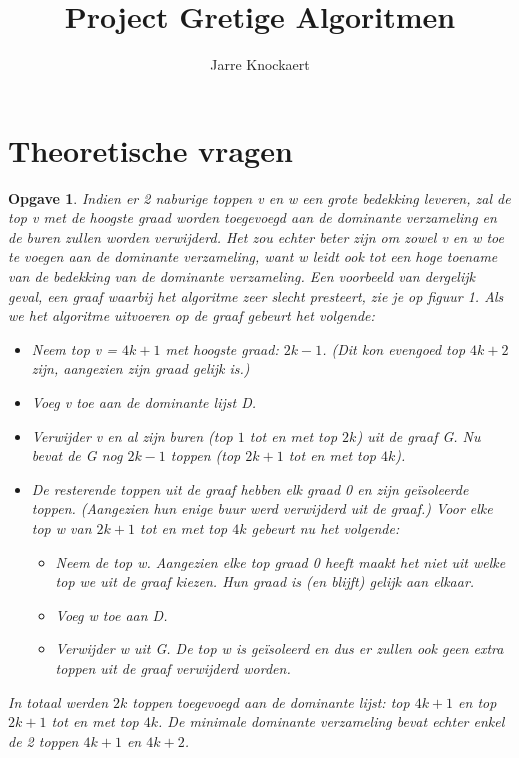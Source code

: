 \documentclass[11pt, a4paper]{article}
\newtheorem{opgave}{Opgave}
\begin{document}
	\title{Project Gretige Algoritmen}
	\author{Jarre Knockaert}
	\maketitle

\newpage

\section{Theoretische vragen}
\begin{opgave}
	Indien er 2 naburige toppen v en w een grote bedekking leveren, zal de top v met de hoogste graad worden toegevoegd aan de dominante verzameling en de buren zullen worden verwijderd. Het zou echter beter zijn om zowel v en w toe te voegen aan de dominante verzameling, want w leidt ook tot een hoge toename van de bedekking van de dominante verzameling. 
	Een voorbeeld van dergelijk geval, een graaf waarbij het algoritme zeer slecht presteert, zie je op figuur 1. Als we het algoritme uitvoeren op de graaf gebeurt het volgende:
	\begin{itemize}
		\item Neem top v = $4k+1$ met hoogste graad: $2k-1$. (Dit kon evengoed top $4k+2$ zijn, aangezien zijn graad gelijk is.)
		\item Voeg v toe aan de dominante lijst D. 
		\item Verwijder v en al zijn buren (top $1$ tot en met top $2k$) uit de graaf G. Nu bevat de G nog $2k-1$ toppen (top $2k+1$ tot en met top $4k$).
		\item De resterende toppen uit de graaf hebben elk graad 0 en zijn ge\"{i}soleerde toppen. (Aangezien hun enige buur werd verwijderd uit de graaf.) Voor elke top w van $2k+1$ tot en met top $4k$ gebeurt nu het volgende:
		\begin{itemize}
			\item Neem de top w. Aangezien elke top graad 0 heeft maakt het niet uit welke top we uit de graaf kiezen. Hun graad is (en blijft) gelijk aan elkaar. 
			\item Voeg w toe aan D. 
			\item Verwijder w uit G. De top w is ge\"{i}soleerd en dus er zullen ook geen extra toppen uit de graaf verwijderd worden. 
		\end{itemize}
	\end{itemize}
	In totaal werden $2k$ toppen toegevoegd aan de dominante lijst: top $4k+1$ en top $2k+1$ tot en met top $4k$. De minimale dominante verzameling bevat echter enkel de 2 toppen $4k+1$ en $4k+2$. 

\end{opgave}
\end{document}
